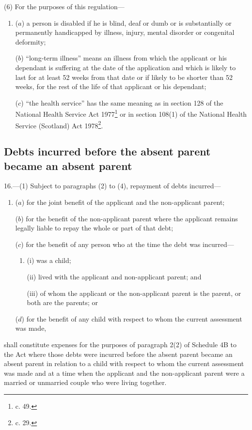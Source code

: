 \documentclass[a4paper]{article}
\begin{document}
(6) For the purposes of this regulation—
\begin{enumerate}\item[]
($a$) a person is disabled if he is blind, deaf or dumb or is substantially or
permanently handicapped by illness, injury, mental disorder or congenital
deformity;

($b$) “long-term illness” means an illness from which the applicant or his
dependant is suffering at the date of the application and which is likely to
last for at least 52 weeks from that date or if likely to be shorter than 52
weeks, for the rest of the life of that applicant or his dependant;

($c$) “the health service” has the same meaning as in section 128 of the National
Health Service Act 1977\footnote{ c. 49.} or in section 108(1) of the National Health Service
(Scotland) Act 1978\footnote{ c. 29.}.
\end{enumerate}

\subsection[16. Debts incurred before the absent parent became an absent parent]{Debts incurred before the absent parent became an absent parent}

16.—(1) Subject
to paragraphs (2) to (4), repayment of debts incurred—
\begin{enumerate}\item[]
($a$) for the joint benefit of the applicant and the non-applicant parent;

($b$) for the benefit of the non-applicant parent where the applicant remains
legally liable to repay the whole or part of that debt;

($c$) for the benefit of any person who at the time the debt was incurred—
\begin{enumerate}\item[]
(i) was a child;

(ii) lived with the applicant and non-applicant parent; and

(iii) of whom the applicant or the non-applicant parent is the parent, or both
are the parents; or
\end{enumerate}

($d$) for the benefit of any child with respect to whom the current assessment was
made,
\end{enumerate}
shall constitute expenses for the purposes of paragraph 2(2) of Schedule 4B to
the Act where those debts were incurred before the absent parent became an
absent parent in relation to a child with respect to whom the current assessment
was made and at a time when the applicant and the non-applicant parent were a
married or unmarried couple who were living together.
\end{document}

